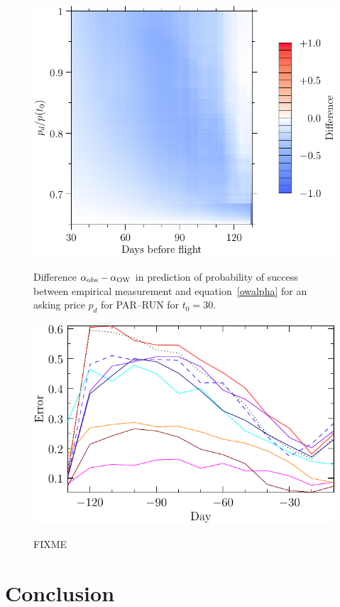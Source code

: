 \documentclass{article}
\begin{document}
\begin{figure}
  \begin{center}
    \includegraphics{pdf/PARRUN_SAT_7_a1_A0}
    \label{PARRUN_SAT_7_a1_A0}
    \caption{Difference $\alpha_{\rm{obs}} - \alpha_{\rm{OW}}$ in
      prediction of probability of success between empirical
      measurement and equation~\eqref{owalpha} for an asking price
      $p_d$ for PAR--RUN for $t_0=30$.}
  \end{center}
\end{figure}

\begin{figure}
  \begin{center}
    \includegraphics{pdf/plotA0}
    \label{plotA0}
    \caption{FIXME}
  \end{center}
\end{figure}




\section{Conclusion}
\end{document}
